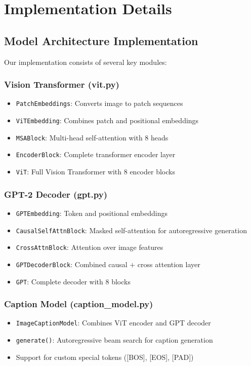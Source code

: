 \documentclass[12pt]{article}
\begin{document}
\section{Implementation Details}

\subsection{Model Architecture Implementation}

Our implementation consists of several key modules:

\subsubsection{Vision Transformer (vit.py)}
\begin{itemize}
\item \texttt{PatchEmbeddings}: Converts image to patch sequences
\item \texttt{ViTEmbedding}: Combines patch and positional embeddings
\item \texttt{MSABlock}: Multi-head self-attention with 8 heads
\item \texttt{EncoderBlock}: Complete transformer encoder layer
\item \texttt{ViT}: Full Vision Transformer with 8 encoder blocks
\end{itemize}

\subsubsection{GPT-2 Decoder (gpt.py)}
\begin{itemize}
\item \texttt{GPTEmbedding}: Token and positional embeddings
\item \texttt{CausalSelfAttnBlock}: Masked self-attention for autoregressive generation
\item \texttt{CrossAttnBlock}: Attention over image features
\item \texttt{GPTDecoderBlock}: Combined causal + cross attention layer
\item \texttt{GPT}: Complete decoder with 8 blocks
\end{itemize}

\subsubsection{Caption Model (caption\_model.py)}
\begin{itemize}
\item \texttt{ImageCaptionModel}: Combines ViT encoder and GPT decoder
\item \texttt{generate()}: Autoregressive beam search for caption generation
\item Support for custom special tokens ([BOS], [EOS], [PAD])
\end{itemize}
\end{document}
